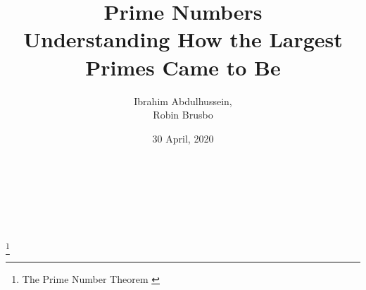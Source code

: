 \documentclass[main.tex]{subfiles}
\begin{document}
\title{
    Prime Numbers \\[0.25em] \large Understanding How the Largest Primes Came to Be
}
\author{Ibrahim Abdulhussein, \\ Robin Brusbo}
\date{30 April, 2020}

\makeatletter

\begin{titlepage}
    \thispagestyle{fancy}
    \renewcommand{\headrulewidth}{0pt}
    \renewcommand{\footrulewidth}{0pt}
    \cfoot{}
    \hbox{}\vfill
    \begin{center}
        {\LARGE\@title}\\[2em]
        {\large\@author}\\[1em]
        {\large\@date}\\[6em]
        \\
        \footnote{The Prime Number Theorem \cite{theorem:prime_num}}
    \end{center}
    \vspace{3cm}\vfill
\end{titlepage}

\makeatother
\end{document}
